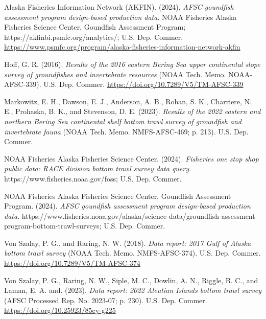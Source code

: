 \documentclass[
  letterpaper,
  oneside,
  open=any]{scrbook}
\newlength{\cslhangindent}
\newlength{\cslentryspacingunit} %
\newenvironment{CSLReferences}[2] %
 {%
  \setlength{\parindent}{0pt}
  \ifodd #1
  \let\oldpar\par
  \def\par{\hangindent=\cslhangindent\oldpar}
  \fi
  \setlength{\parskip}{#2\cslentryspacingunit}
 }%
 {}
\begin{document}
\hypertarget{refs}{}
\begin{CSLReferences}{1}{0}
\leavevmode{}%
Alaska Fisheries Information Network (AKFIN). (2024). \emph{AFSC
goundfish assessment program design-based production data}. {NOAA
Fisheries Alaska Fisheries Science Center, Goundfish Assessment
Program}; https://akfinbi.psmfc.org/analytics/; {U.S. Dep. Commer.}
\url{https://www.psmfc.org/program/alaska-fisheries-information-network-akfin}

\leavevmode{}%
Hoff, G. R. (2016). \emph{Results of the 2016 eastern {Bering Sea} upper
continental slope survey of groundfishes and invertebrate resources}
(NOAA Tech. Memo. NOAA-AFSC-339). {U.S. Dep. Commer.}
\url{https://doi.org/10.7289/V5/TM-AFSC-339}

\leavevmode{}%
Markowitz, E. H., Dawson, E. J., Anderson, A. B., Rohan, S. K.,
Charriere, N. E., Prohaska, B. K., and Stevenson, D. E. (2023).
\emph{Results of the 2022 eastern and northern {Bering Sea} continental
shelf bottom trawl survey of groundfish and invertebrate fauna} (NOAA
Tech. Memo. NMFS-AFSC-469; p. 213). {U.S. Dep. Commer.}

\leavevmode{}%
NOAA Fisheries Alaska Fisheries Science Center. (2024). \emph{Fisheries
one stop shop public data: RACE division bottom trawl survey data
query}. https://www.fisheries.noaa.gov/foss; {U.S. Dep. Commer.}

\leavevmode{}%
NOAA Fisheries Alaska Fisheries Science Center, Goundfish Assessment
Program. (2024). \emph{AFSC goundfish assessment program design-based
production data}.
https://www.fisheries.noaa.gov/alaska/science-data/groundfish-assessment-program-bottom-trawl-surveys;
{U.S. Dep. Commer.}

\leavevmode{}%
Von Szalay, P. G., and Raring, N. W. (2018). \emph{Data report: 2017
{Gulf of Alaska} bottom trawl survey} (NOAA Tech. Memo. NMFS-AFSC-374).
{U.S. Dep. Commer.} \url{https://doi.org/10.7289/V5/TM-AFSC-374}

\leavevmode{}%
Von Szalay, P. G., Raring, N. W., Siple, M. C., Dowlin, A. N., Riggle,
B. C., and Laman, E. A. and. (2023). \emph{Data report: 2022 {Aleutian
Islands} bottom trawl survey} (AFSC Processed Rep. No. 2023-07; p. 230).
{U.S. Dep. Commer.} \url{https://doi.org/10.25923/85cy-g225}

\end{CSLReferences}


\backmatter
\end{document}
